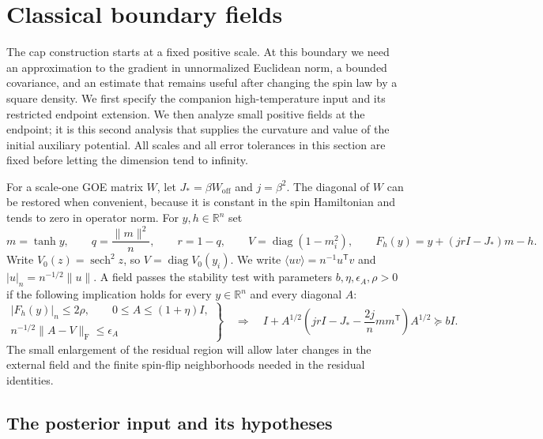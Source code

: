 \section{Classical boundary fields}\label{cap:classical}

The cap construction starts at a fixed positive scale. At this boundary we
need an approximation to the gradient in unnormalized Euclidean norm, a
bounded covariance, and an estimate that remains useful after changing the
spin law by a square density. We first specify the companion high-temperature
input and its restricted endpoint extension. We then analyze small positive
fields at the endpoint; it is this second analysis that supplies the curvature
and value of the initial auxiliary potential. All scales and all error
tolerances in this section are fixed before letting the dimension tend to
infinity.

For a scale-one GOE matrix $W$, let $J_*=\beta W_{\mathrm{off}}$ and
$j=\beta^2$. The diagonal of $W$ can be restored when convenient, because it
is constant in the spin Hamiltonian and tends to zero in operator norm. For
$y,h\in\mathbb R^n$ set
\begin{equation}\label{cap:classical-map}
 m=\tanh y,\qquad q=\frac{\|m\|^2}{n},\qquad r=1-q,\qquad
 V=\operatorname{diag}(1-m_i^2),\qquad
 F_h(y)=y+(jrI-J_*)m-h.
\end{equation}
Write \(V_0(z)=\operatorname{sech}^2z\), so \(V=\operatorname{diag}V_0(y_i)\).
We write $\langle u v\rangle=n^{-1}u^{\mathsf T}v$ and
$|u|_n=n^{-1/2}\|u\|$. A field passes the stability test with parameters
\(b,\eta,\epsilon_A,\rho>0\) if the following implication holds for every
\(y\in\mathbb R^n\) and every diagonal \(A\):
\begin{equation}\label{cap:stability-test}
 \left.
 \begin{gathered}
 |F_h(y)|_n\le 2\rho,\qquad
 0\le A\le(1+\eta)I,\\
 n^{-1/2}\|A-V\|_{\mathrm F}\le\epsilon_A
 \end{gathered}
 \right\}
 \quad\Longrightarrow\quad
 I+A^{1/2}\left(jrI-J_*-\frac{2j}{n}mm^{\mathsf T}\right)A^{1/2}
 \succeq bI.
\end{equation}
The small enlargement of the residual region will allow later changes in
the external field and the finite spin-flip neighborhoods needed in the
residual identities.

\subsection{The posterior input and its hypotheses}

